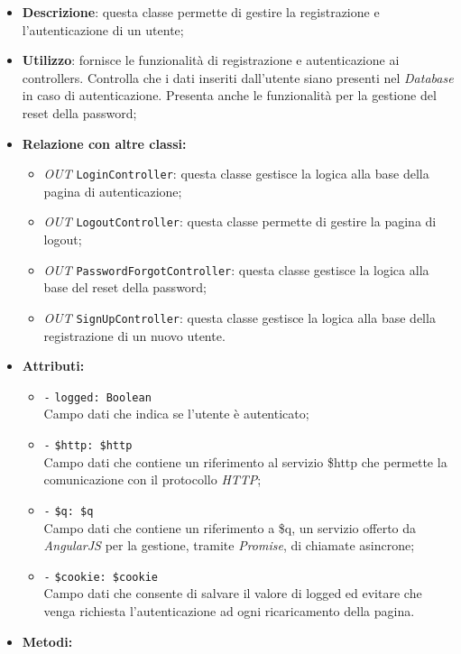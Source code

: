 \begin{itemize}
	\item \textbf{Descrizione}: questa classe permette di gestire la registrazione e l'autenticazione di un utente;
	\item \textbf{Utilizzo}: fornisce le funzionalità di registrazione e autenticazione ai controllers. Controlla che i dati inseriti dall'utente siano presenti nel \textit{Database} in caso di autenticazione. Presenta anche le funzionalità per la gestione del reset della password;
	\item \textbf{Relazione con altre classi:}
	\begin{itemize}
		\item \textit{OUT} \texttt{LoginController}: questa classe gestisce la logica alla base della pagina di autenticazione;
		\item \textit{OUT} \texttt{LogoutController}: questa classe permette di gestire la pagina di logout;
		\item \textit{OUT} \texttt{PasswordForgotController}: questa classe gestisce la logica alla base del reset della password;
		\item \textit{OUT} \texttt{SignUpController}: questa classe gestisce la logica alla base della registrazione di un nuovo utente.
	\end{itemize}
	\item \textbf{Attributi:}
	\begin{itemize}
		\item \texttt{-} \texttt{logged: Boolean} \\ Campo dati che indica se l'utente è autenticato;
		\item \texttt{-} \texttt{\$http: \$http} \\ Campo dati che contiene un riferimento al servizio \$http che permette la comunicazione con il protocollo \textit{HTTP};
		\item \texttt{-} \texttt{\$q: \$q} \\ Campo dati che contiene un riferimento a \$q, un servizio offerto da \textit{AngularJS} per la gestione, tramite \textit{Promise}, di chiamate asincrone;
		\item \texttt{-} \texttt{\$cookie: \$cookie} \\ Campo dati che consente di salvare il valore di logged ed evitare che venga richiesta l'autenticazione ad ogni ricaricamento della pagina.
	\end{itemize}
	\item \textbf{Metodi:}

\end{itemize}
